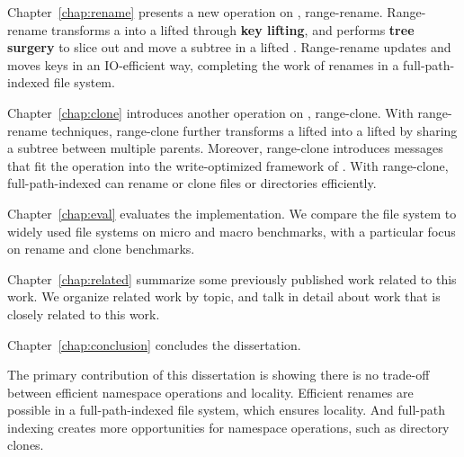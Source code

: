 Chapter~\ref{chap:rename} presents a new operation on \bets, range-rename.
Range-rename transforms a \bet into a lifted \bet through \textbf{key lifting},
and performs \textbf{tree surgery} to slice out and move a subtree in a lifted
\bets.
Range-rename updates and moves keys in an IO-efficient way,
completing the work of renames in a full-path-indexed file system.

Chapter~\ref{chap:clone} introduces another operation on \bets, range-clone.
With range-rename techniques, range-clone further transforms a lifted \bet into
a lifted \bedag by sharing a subtree between multiple parents.
Moreover, range-clone introduces \goto messages that fit the operation into the
write-optimized framework of \bets.
With range-clone, full-path-indexed can rename or clone files or directories
efficiently.

Chapter~\ref{chap:eval} evaluates the implementation.
We compare the file system to widely used file systems on micro and macro
benchmarks, with a particular focus on rename and clone benchmarks.

Chapter~\ref{chap:related} summarize some previously published work related to
this work.
We organize related work by topic, and talk in detail about work that is closely
related to this work.

Chapter~\ref{chap:conclusion} concludes the dissertation.

The primary contribution of this dissertation is showing there is no trade-off
between efficient namespace operations and locality.
Efficient renames are possible in a full-path-indexed file system, which ensures
locality.
And full-path indexing creates more opportunities for namespace operations,
such as directory clones.

